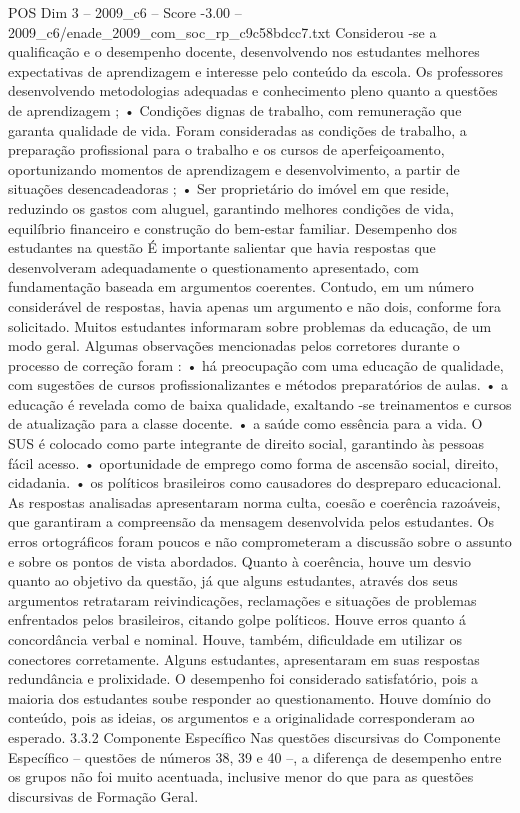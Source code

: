 \begin{textsample}{POS Dim 3 – 2009\_c6 – Score -3.00 – 2009\_c6/enade\_2009\_com\_soc\_rp\_c9c58bdcc7.txt}
Considerou -se a qualificação e o desempenho docente, desenvolvendo nos estudantes melhores expectativas de aprendizagem e interesse pelo conteúdo da escola.
Os professores desenvolvendo metodologias adequadas e conhecimento pleno quanto a questões de aprendizagem ; • Condições dignas de trabalho, com remuneração que garanta qualidade de vida.
Foram consideradas as condições de trabalho, a preparação profissional para o trabalho e os cursos de aperfeiçoamento, oportunizando momentos de aprendizagem e desenvolvimento, a partir de situações desencadeadoras ; • Ser proprietário do imóvel em que reside, reduzindo os gastos com aluguel, garantindo melhores condições de vida, equilíbrio financeiro e construção do bem-estar familiar.
Desempenho dos estudantes na questão É importante salientar que havia respostas que desenvolveram adequadamente o questionamento apresentado, com fundamentação baseada em argumentos coerentes.
Contudo, em um número considerável de respostas, havia apenas um argumento e não dois, conforme fora solicitado.
Muitos estudantes informaram sobre problemas da educação, de um modo geral.
Algumas observações mencionadas pelos corretores durante o processo de correção foram : • há preocupação com uma educação de qualidade, com sugestões de cursos profissionalizantes e métodos preparatórios de aulas. • a educação é revelada como de baixa qualidade, exaltando -se treinamentos e cursos de atualização para a classe docente. • a saúde como essência para a vida.
O SUS é colocado como parte integrante de direito social, garantindo às pessoas fácil acesso. • oportunidade de emprego como forma de ascensão social, direito, cidadania. • os políticos brasileiros como causadores do despreparo educacional.
As respostas analisadas apresentaram norma culta, coesão e coerência razoáveis, que garantiram a compreensão da mensagem desenvolvida pelos estudantes.
Os erros ortográficos foram poucos e não comprometeram a discussão sobre o assunto e sobre os pontos de vista abordados.
Quanto à coerência, houve um desvio quanto ao objetivo da questão, já que alguns estudantes, através dos seus argumentos retrataram reivindicações, reclamações e situações de problemas enfrentados pelos brasileiros, citando golpe políticos.
Houve erros quanto á concordância verbal e nominal.
Houve, também, dificuldade em utilizar os conectores corretamente.
Alguns estudantes, apresentaram em suas respostas redundância e prolixidade.
O desempenho foi considerado satisfatório, pois a maioria dos estudantes soube responder ao questionamento.
Houve domínio do conteúdo, pois as ideias, os argumentos e a originalidade corresponderam ao esperado. 3.3.2 Componente Específico Nas questões discursivas do Componente Específico – questões de números 38, 39 e 40 –, a diferença de desempenho entre os grupos não foi muito acentuada, inclusive menor do que para as questões discursivas de Formação Geral.

\end{textsample}

